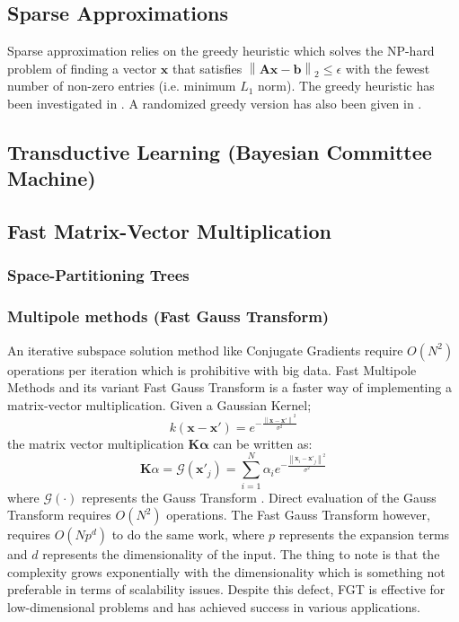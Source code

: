 \documentclass{article}
\begin{document}
\subsection{Sparse Approximations}
Sparse approximation relies on the greedy heuristic which solves the NP-hard problem of finding a vector $\mathbf{x}$ that satisfies $\left \| \mathbf{A}\mathbf{x} -\mathbf{b} \right \|_2\leq \epsilon $ with the fewest number of non-zero entries (i.e. minimum $L_1$ norm). The greedy heuristic has been investigated in \cite{natarajan}. A randomized greedy version has also been given in \cite{smolaGreedy}.

\subsection{Transductive Learning (Bayesian Committee Machine)}

\subsection{Fast Matrix-Vector Multiplication}

\subsubsection{Space-Partitioning Trees}
\subsubsection{Multipole methods (Fast Gauss Transform)}
An iterative subspace solution method like Conjugate Gradients require $O(N^2)$ operations per iteration which is prohibitive with big data. Fast Multipole Methods and its variant Fast Gauss Transform is a faster way of implementing a matrix-vector multiplication. Given a Gaussian Kernel;
\begin{equation}
k(\mathbf{x}-\mathbf{x'})=e^{-\frac{\left \| \mathbf{x}-\mathbf{x'} \right \|^2}{\sigma^2}}
\end{equation}
the matrix vector multiplication $\mathbf{K}\mathbf{\alpha}$ can be written as:
\begin{equation}
\mathbf{K}\alpha=\mathcal{G}(\mathbf{x'}_j)=\sum_{i=1}^N\alpha_ie^{-\frac{\left \| \mathbf{x}_i-\mathbf{x'}_j \right \|^2}{\sigma^2}}
\end{equation}
where $\mathcal{G}(\cdot)$ represents the Gauss Transform \cite{FGTkernel}. Direct evaluation of the Gauss Transform requires $O(N^2)$ operations. The Fast Gauss Transform however, requires $O(Np^d)$ to do the same work, where $p$ represents the expansion terms and $d$ represents the dimensionality of the input. The thing to note is that the complexity grows exponentially with the dimensionality which is something not preferable in terms of scalability issues.  Despite this defect, FGT is effective for low-dimensional problems and has achieved success in various applications. 
\end{document}
